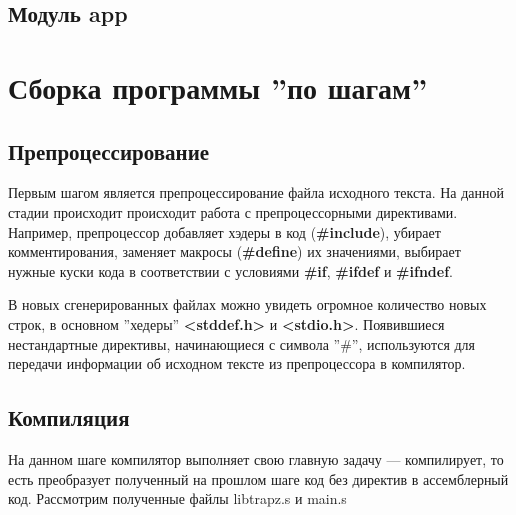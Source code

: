 
\parindent=1cm %

\subsection{Модуль app}

\parindent=1cm %

\section{Сборка программы ''по шагам''}
\subsection{Препроцессирование}
Первым шагом является препроцессирование файла исходного текста. На данной стадии происходит происходит работа с препроцессорными директивами. Например, препроцессор добавляет хэдеры в код (\textbf{\#include}), убирает комментирования, заменяет макросы (\textbf{\#define}) их значениями, выбирает нужные куски кода в соответствии с условиями \textbf{\#if}, \textbf{\#ifdef} и \textbf{\#ifndef}. 

\makeatletter
\def\lst@PlaceNumber{\llap{\normalfont
                \lst@numberstyle{\the\lst@lineno}\kern\lst@numbersep}}
\makeatother


\parindent=1cm


\parindent=1cm

В новых сгенерированных файлах можно увидеть огромное количество новых строк, в основном ''хедеры'' \textbf{<stddef.h>} и \textbf{<stdio.h>}. Появившиеся нестандартные директивы, начинающиеся с символа ''\#'', используются для передачи информации об исходном тексте из препроцессора в компилятор.

\subsection{Компиляция}
На данном шаге компилятор выполняет свою главную задачу — компилирует, то есть преобразует полученный на прошлом шаге код без директив в ассемблерный код. Рассмотрим полученные файлы libtrapz.s и main.s

